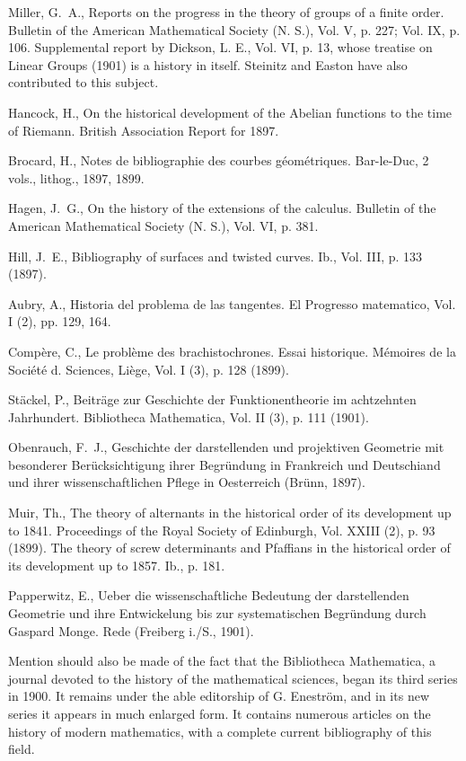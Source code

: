 \documentclass[oneside]{book}
\begin{document}
{\bigskip

Miller, G.~A., Reports on the progress in the theory of groups of a
finite order. Bulletin of the American Mathematical Society (N. S.),
Vol. V, p. 227; Vol. IX, p. 106. Supplemental report by Dickson,
L. E., Vol. VI, p. 13, whose treatise on Linear Groups (1901) is a
history in itself. Steinitz and Easton have also contributed to this
subject.

Hancock, H., On the historical development of the Abelian functions
to the time of Riemann. British Association Report for 1897.

Brocard, H., Notes de bibliographie des courbes g\'eom\'etriques.
Bar-le-Duc, 2 vols., lithog., 1897, 1899.

Hagen, J.~G., On the history of the extensions of the calculus.
Bulletin of the American Mathematical Society (N. S.), Vol. VI,
p. 381.

Hill, J.~E., Bibliography of surfaces and twisted curves. Ib., Vol.
III, p. 133 (1897).

Aubry, A., Historia del problema de las tangentes. El Progresso
matematico, Vol. I (2), pp. 129, 164.

Comp\`ere, C., Le probl\`eme des brachistochrones. Essai historique.
M\'emoires de la Soci\'et\'e d. Sciences, Li\`ege, Vol. I (3),
p. 128 (1899).

St\"ackel, P., Beitr\"age zur Geschichte der Funktionentheorie im
achtzehnten Jahrhundert. Bibliotheca Mathematica, Vol. II (3),
p. 111 (1901).

Obenrauch, F.~J., Geschichte der darstellenden und projektiven
Geometrie mit besonderer Ber\"ucksichtigung ihrer Begr\"undung in
Frankreich und Deutschiand und ihrer wissenschaftlichen Pflege in
Oesterreich (Br\"unn, 1897).

Muir, Th., The theory of alternants in the historical order of its
development up to 1841. Proceedings of the Royal Society of
Edinburgh, Vol. XXIII (2), p. 93 (1899). The theory of screw
determinants and Pfaffians in the historical order of its
development up to 1857. Ib., p. 181.

Papperwitz, E., Ueber die wissenschaftliche Bedeutung der
darstellenden Geometrie und ihre Entwickelung bis zur
systematischen Begr\"undung durch Gaspard Monge. Rede (Freiberg
i./S., 1901).

\bigskip

Mention should also be made of the fact that the Bibliotheca
Mathematica, a journal devoted to the history of the mathematical
sciences, began its third series in 1900. It remains under the able
editorship of G. Enestr\"om, and in its new series it appears in
much enlarged form. It contains numerous articles on the history of
modern mathematics, with a complete current bibliography of this
field.

}
\end{document}
